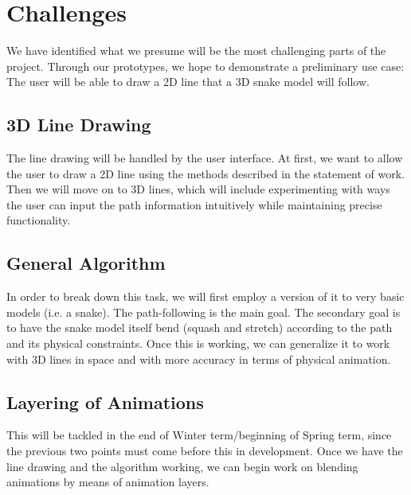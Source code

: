 \section{Challenges}
\label{sec:challenges}
We have identified what we presume will be the most challenging parts of the project. Through our prototypes, we hope to demonstrate a preliminary use case: The user will be able to draw a 2D line that a 3D snake model will follow.

\subsection{3D Line Drawing}
The line drawing will be handled by the user interface. At first, we want to allow the user to draw a 2D line using the methods described in the statement of work. Then we will move on to 3D lines, which will include experimenting with ways the user can input the path information intuitively while maintaining precise functionality.
 
\subsection{General Algorithm}
In order to break down this task, we will first employ a version of it to very basic models (i.e. a snake). The path-following is the main goal. The secondary goal is to have the snake model itself bend (squash and stretch) according to the path and its physical constraints. Once this is working, we can generalize it to work with 3D lines in space and with more accuracy in terms of physical animation.

\subsection{Layering of Animations}
This will be tackled in the end of Winter term/beginning of Spring term, since the previous two points must come before this in development. Once we have the line drawing and the algorithm working, we can begin work on blending animations by means of animation layers.

